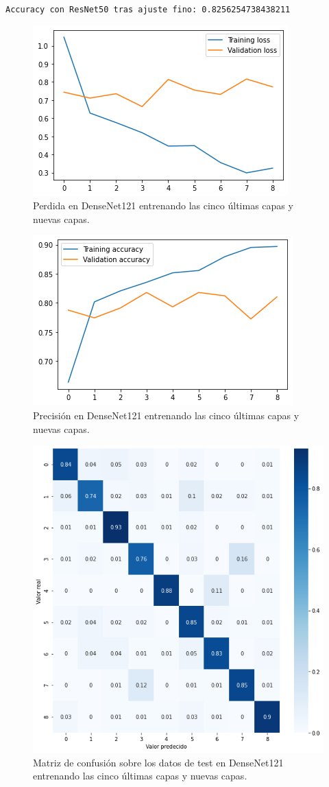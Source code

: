 \begin{lstlisting}
Accuracy con ResNet50 tras ajuste fino: 0.8256254738438211
\end{lstlisting}




\begin{figure}[H]
  \centering
  \includegraphics[width=0.5\linewidth]{Imagenes/entrenamiento_redes/5-ult/densenet_5ult_loss.png}
  \caption{Perdida en DenseNet121 entrenando las cinco últimas capas y nuevas capas.}
\end{figure}

\begin{figure}[H]
  \centering
  \includegraphics[width=0.5\linewidth]{Imagenes/entrenamiento_redes/5-ult/densenet_5ult_acc.png}
  \caption{Precisión en DenseNet121 entrenando las cinco últimas capas y nuevas capas.}
\end{figure}

\begin{figure}[H]
  \centering
  \includegraphics[width=0.5\linewidth]{Imagenes/entrenamiento_redes/5-ult/densenet_5ult_matriz.png}
  \caption{Matriz de confusión sobre los datos de test en DenseNet121 entrenando las cinco últimas capas y nuevas capas.}
\end{figure}


